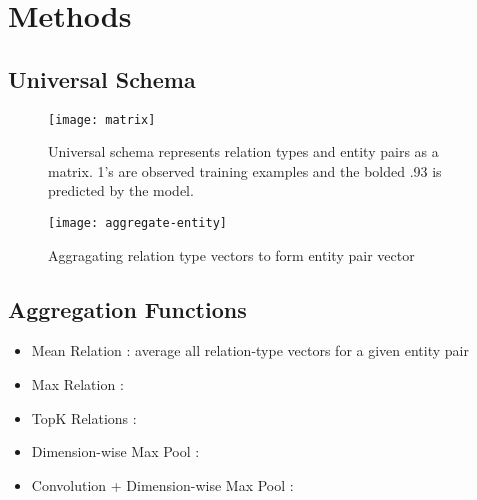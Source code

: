 \section{Methods \label{sec:methods}}

\subsection {Universal Schema}

\begin{figure}[h]
\caption{Universal schema represents relation types and entity pairs as a matrix.
1's are observed training examples and the bolded .93 is predicted by the model.}
\centering
\texttt{[image: matrix]}
\end{figure}

\begin{figure}[h]
\caption{Aggragating relation type vectors to form entity pair vector}
\centering
\texttt{[image: aggregate-entity]}
\end{figure}


\subsection {Aggregation Functions}
\begin{itemize}
  \item Mean Relation : average all relation-type vectors for a given entity pair
  \item Max Relation :
  \item TopK Relations :
  \item Dimension-wise Max Pool :
  \item Convolution + Dimension-wise Max Pool :
\end{itemize}